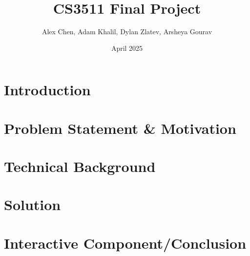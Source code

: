 \documentclass{article}
\title{CS3511 Final Project}
\author{Alex Chen, Adam Khalil, Dylan Zlatev, Arsheya Gourav}
\date{April 2025}
\begin{document}
\maketitle

\section{Introduction}
\section{Problem Statement \& Motivation}
\section{Technical Background}
\section{Solution}
\section{Interactive Component/Conclusion}
\end{document}
